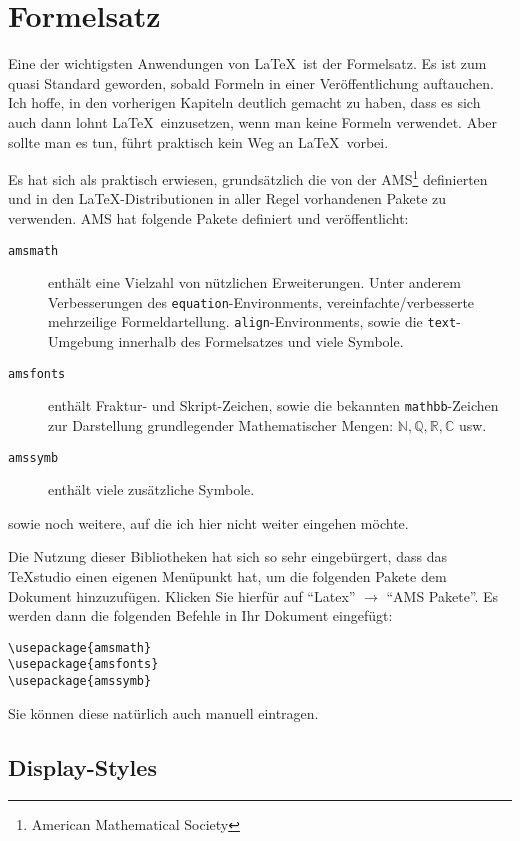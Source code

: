 
\chapter{Formelsatz}\label{chap:formel}

Eine der wichtigsten Anwendungen von \LaTeX\ ist der Formelsatz. Es ist zum quasi Standard geworden, sobald Formeln in einer Veröffentlichung auftauchen. Ich hoffe, in den vorherigen Kapiteln deutlich gemacht zu haben, dass es sich auch dann lohnt \LaTeX\ einzusetzen, wenn man keine Formeln verwendet. Aber sollte man es tun, führt praktisch kein Weg an \LaTeX\ vorbei.

Es hat sich als praktisch erwiesen, grundsätzlich die von der AMS\footnote{American Mathematical Society} definierten und in den \LaTeX-Distributionen in aller Regel vorhandenen Pakete zu verwenden. AMS hat folgende Pakete definiert und veröffentlicht:  

\begin{description}
\item[\texttt{amsmath}] enthält eine Vielzahl von nützlichen Erweiterungen. Unter anderem Verbesserungen des \texttt{equation}-Environments, vereinfachte/verbesserte mehrzeilige Formeldartellung. \texttt{align}-Environments, sowie die \texttt{text}-Umgebung innerhalb des Formelsatzes und viele Symbole.
\item[\texttt{amsfonts}] enthält Fraktur- und Skript-Zeichen, sowie die bekannten \texttt{mathbb}-Zeichen zur Darstellung grundlegender Mathematischer Mengen: $\mathbb{N}, \mathbb{Q}, \mathbb{R}, \mathbb{C}$ usw.
\item[\texttt{amssymb}] enthält viele zusätzliche Symbole.

\end{description}
sowie noch weitere, auf die ich hier nicht weiter eingehen möchte.

Die Nutzung dieser Bibliotheken hat sich so sehr eingebürgert, dass das TeXstudio einen eigenen Menüpunkt hat, um die folgenden Pakete dem Dokument hinzuzufügen. Klicken Sie hierfür auf "`Latex"' $\rightarrow$ "`AMS Pakete"'. Es werden dann die folgenden Befehle in Ihr Dokument eingefügt:

\begin{verbatim}
\usepackage{amsmath}
\usepackage{amsfonts}
\usepackage{amssymb}
\end{verbatim}
Sie können diese natürlich auch manuell eintragen.

\section{Display-Styles}

